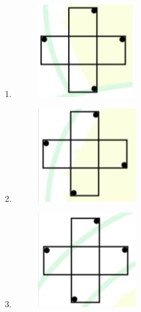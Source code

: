 \documentclass[journal,12pt,onecolumn]{article}
\theoremstyle{remark}
\begin{document}
\begin{enumerate}
\hfill{}
\begin{enumerate}
\item \begin{figure}[H]
    \centering
    \includegraphics[width=0.5\columnwidth]{figs/1q-10a.jpg}
    \caption{}
    \label{fig:q8}
\end{figure}
\item \begin{figure}[H]
    \centering
    \includegraphics[width=0.5\columnwidth]{figs/1q-10b.jpg}
    \caption{}
    \label{fig:q8}
\end{figure}
\item \begin{figure}[H]
    \centering
    \includegraphics[width=0.5\columnwidth]{figs/1q-10c.jpg}

\end{figure}
\end{enumerate}
\end{enumerate}
\end{document}
